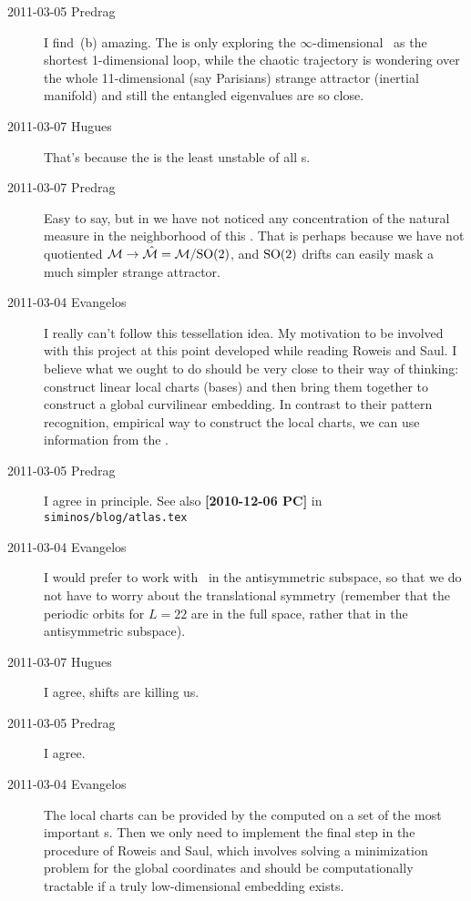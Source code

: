 \begin{description}
\item[2011-03-05 Predrag]
  I find
  \,(b) amazing. The {\po}  is
  only exploring the $\infty$-dimensional \statesp\ as the
  shortest 1-dimensional loop, while the chaotic trajectory is
  wondering over the whole 11-dimensional (say Parisians) strange attractor
  (inertial manifold) and still the entangled eigenvalues are so close.

\item[2011-03-07 Hugues]
  That's because the {\po}  is the least unstable of all
  \po s.

\item[2011-03-07 Predrag] Easy to say, but in  we have
  not noticed any concentration of the natural measure in the neighborhood of
  this \po. That is perhaps because we have not quotiented
  $\mathcal{M} \to \hat{\mathcal{M}} = \mathcal{M}/\textrm{SO}(2)$, and $\textrm{SO}(2)$ drifts can easily
  mask a much simpler strange attractor.


\item[2011-03-04 Evangelos]
  I really can't follow this tessellation idea. My motivation to be
  involved with this project at this point developed while reading Roweis
  and Saul. I believe what we ought to do should be very close
  to their way of thinking: construct linear local charts (bases) and then
  bring them together to construct a global curvilinear embedding. In
  contrast to their pattern recognition, empirical way to construct the
  local charts, we can use information from the {\cLvs}.

\item[2011-03-05 Predrag]
  I agree in principle.
  See also {\bf [2010-12-06 PC]} in \texttt{siminos/blog/atlas.tex}

\item[2011-03-04 Evangelos]
  I would prefer to work with \KS\ in the antisymmetric subspace, so that we do not
  have to worry about the translational symmetry (remember that the periodic
  orbits for $L=22$ are in the full space, rather that in the antisymmetric
  subspace).

\item[2011-03-07 Hugues]
  I agree, shifts are killing us.

\item[2011-03-05 Predrag]
  I agree.


\item[2011-03-04 Evangelos]
  The local charts can be provided by the {\entangled} {\cLvs} computed on a set of the most important \po s. Then we only need
  to implement the final step in the procedure of Roweis and
  Saul, which involves solving a minimization problem for the
  global coordinates and should be computationally tractable if a truly
  low-dimensional embedding exists.


\end{description}
